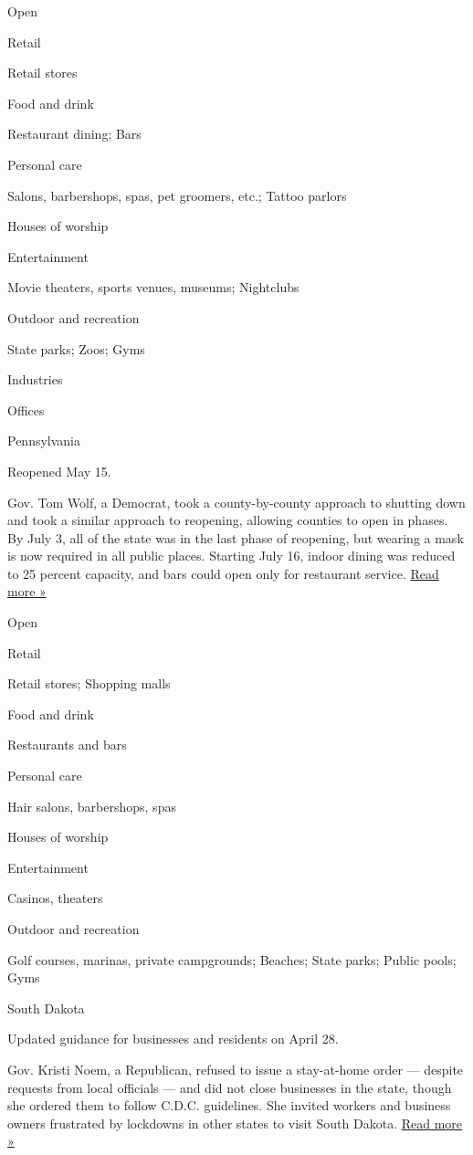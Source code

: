 Open

Retail

Retail stores

Food and drink

Restaurant dining; Bars

Personal care

Salons, barbershops, spas, pet groomers, etc.; Tattoo parlors

Houses of worship

Entertainment

Movie theaters, sports venues, museums; Nightclubs

Outdoor and recreation

State parks; Zoos; Gyms

Industries

Offices

Pennsylvania

Reopened May 15.

Gov. Tom Wolf, a Democrat, took a county-by-county approach to shutting
down and took a similar approach to reopening, allowing counties to open
in phases. By July 3, all of the state was in the last phase of
reopening, but wearing a mask is now required in all public places.
Starting July 16, indoor dining was reduced to 25 percent capacity, and
bars could open only for restaurant service.
\href{https://www.wgal.com/article/gov-tom-wolf-imposes-new-restrictions-on-pennsylvania-bars-restaurants-gatherings/33346910}{Read
more »}

Open

Retail

Retail stores; Shopping malls

Food and drink

Restaurants and bars

Personal care

Hair salons, barbershops, spas

Houses of worship

Entertainment

Casinos, theaters

Outdoor and recreation

Golf courses, marinas, private campgrounds; Beaches; State parks; Public
pools; Gyms

South Dakota

Updated guidance for businesses and residents on April 28.

Gov. Kristi Noem, a Republican, refused to issue a stay-at-home order
--- despite requests from local officials --- and did not close
businesses in the state, though she ordered them to follow C.D.C.
guidelines. She invited workers and business owners frustrated by
lockdowns in other states to visit South Dakota.
\href{https://www.usnews.com/news/best-states/south-dakota/articles/2020-04-28/south-dakota-governor-to-unveil-plan-to-reopen-state}{Read
more »}


